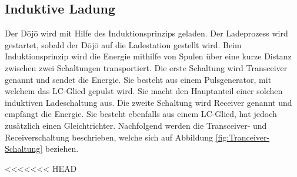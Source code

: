 \subsection{Induktive Ladung}\label{sec:energieuebertragung}

Der Dōjō wird mit Hilfe des Induktionsprinzips geladen. Der Ladeprozess wird gestartet, sobald der Dōjō auf die Ladestation gestellt wird. Beim Induktionsprinzip wird die Energie mithilfe von Spulen über eine kurze Distanz zwischen zwei Schaltungen transportiert. Die erste Schaltung wird Transceiver genannt und sendet die Energie. Sie besteht aus einem Pulsgenerator, mit welchem das LC-Glied gepulst wird. Sie macht den Hauptanteil einer solchen induktiven Ladeschaltung aus. Die zweite Schaltung wird Receiver genannt und empfängt die Energie. Sie besteht ebenfalls aus einem LC-Glied, hat jedoch zusätzlich einen Gleichtrichter. Nachfolgend werden die Transceiver- und Receiverschaltung beschrieben, welche sich auf Abbildung \ref{fig:Tranceiver-Schaltung} beziehen.

<<<<<<< HEAD
